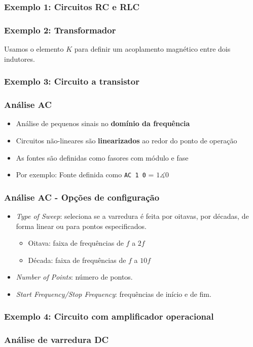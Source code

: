 \documentclass{beamer}
\begin{document}
\begin{frame}
\frametitle{Exemplo 1: Circuitos RC e RLC}
\end{frame}

\begin{frame}
\frametitle{Exemplo 2: Transformador}
Usamos o elemento $K$ para definir um acoplamento magnético entre dois indutores.
\end{frame}

\begin{frame}
\frametitle{Exemplo 3: Circuito a transistor}
\end{frame}


\begin{frame}
\frametitle{Análise AC}
\begin{itemize}
\item{Análise de pequenos sinais no \textbf{domínio da frequência}}
\item{Circuitos não-lineares são \textbf{linearizados} ao redor do ponto de operação}
\item{As fontes são definidas como fasores com módulo e fase}
\item{Por exemplo: Fonte definida como \texttt{AC 1 0} = $1\measuredangle 0$} 
\end{itemize}
\end{frame}

\begin{frame}
\frametitle{Análise AC - Opções de configuração}
\begin{itemize}
\item{\textit{Type of Sweep}}: seleciona se a varredura é feita por oitavas, por décadas, de forma linear ou para pontos especificados.
\begin{itemize}
\item{Oitava}: faixa de frequências de $f$ a $2 f$
\item{Década}: faixa de frequências de $f$ a $10 f$
\end{itemize}
\item{\textit{Number of Points}}: número de pontos.
\item{\textit{Start Frequency/Stop Frequency}}: frequências de início e de fim.
\end{itemize}
\end{frame}

\begin{frame}
\frametitle{Exemplo 4: Circuito com amplificador operacional}
\end{frame}

\begin{frame}
\frametitle{Análise de varredura DC}
\end{frame}
\end{document}
